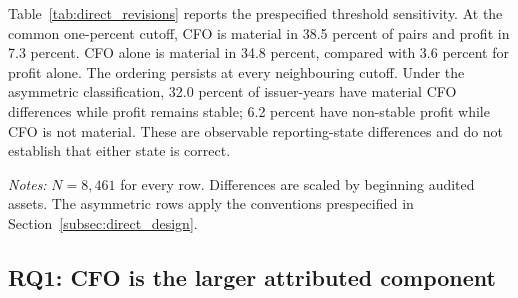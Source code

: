 Table~\ref{tab:direct_revisions} reports the prespecified threshold sensitivity. At the common one-percent cutoff, CFO is material in 38.5 percent of pairs and profit in 7.3 percent. CFO alone is material in 34.8 percent, compared with 3.6 percent for profit alone. The ordering persists at every neighbouring cutoff. Under the asymmetric classification, 32.0 percent of issuer-years have material CFO differences while profit remains stable; 6.2 percent have non-stable profit while CFO is not material. These are observable reporting-state differences and do not establish that either state is correct.

\begin{table}[htbp]
\centering
\caption{Direct constructed-pre-to-post-audit annual differences}
\label{tab:direct_revisions}
\scriptsize
{}
\begin{minipage}{0.97\textwidth}\footnotesize
\textit{Notes:} $N=8{,}461$ for every row. Differences are scaled by beginning audited assets. The asymmetric rows apply the conventions prespecified in Section~\ref{subsec:direct_design}.
\end{minipage}
\end{table}

\subsection{RQ1: CFO is the larger attributed component}\label{subsec:results_rq1}

